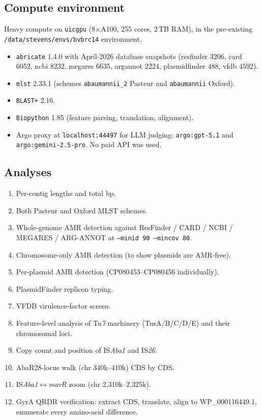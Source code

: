 \documentclass[11pt]{article}
\begin{document}
\subsection{Compute environment}
Heavy compute on \texttt{uicgpu} (8$\times$A100, 255 cores, 2\,TB RAM),
in the pre-existing \texttt{/data/stevens/envs/bvbrc14} environment.

\begin{itemize}[nosep]
  \item \texttt{abricate} 1.4.0 with April-2026 database snapshots
        (resfinder 3206, card 6052, ncbi 8232, megares 6635,
        argannot 2224, plasmidfinder 488, vfdb 4592).
  \item \texttt{mlst} 2.33.1 (schemes \texttt{abaumannii\_2} Pasteur and
        \texttt{abaumannii} Oxford).
  \item \texttt{BLAST+} 2.16.
  \item \texttt{Biopython} 1.85 (feature parsing, translation, alignment).
  \item Argo proxy at \texttt{localhost:44497} for LLM judging:
        \texttt{argo:gpt-5.1} and \texttt{argo:gemini-2.5-pro}.
        No paid API was used.
\end{itemize}

\subsection{Analyses}
\begin{enumerate}[nosep]
  \item Per-contig lengths and total bp.
  \item Both Pasteur and Oxford MLST schemes.
  \item Whole-genome AMR detection against ResFinder / CARD / NCBI /
        MEGARES / ARG-ANNOT at \texttt{--minid 90 --mincov 80}.
  \item Chromosome-only AMR detection (to show plasmids are AMR-free).
  \item Per-plasmid AMR detection (CP080453--CP080456 individually).
  \item PlasmidFinder replicon typing.
  \item VFDB virulence-factor screen.
  \item Feature-level analysis of Tn\emph{7} machinery
        (TnsA/B/C/D/E) and their chromosomal loci.
  \item Copy count and position of IS\emph{Aba1} and IS\emph{26}.
  \item AbaR28-locus walk (chr 340k--410k) CDS by CDS.
  \item IS\emph{Aba1}$\leftrightarrow$\emph{marR} zoom (chr 2{,}310k--2{,}325k).
  \item GyrA QRDR verification: extract CDS, translate, align to
        WP\_000116449.1, enumerate every amino-acid difference.
\end{enumerate}
\end{document}
